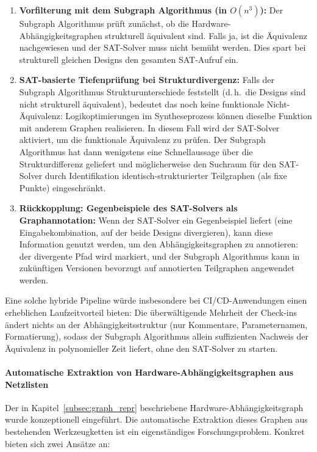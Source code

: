 ﻿\documentclass[12pt,a4paper]{report}
\begin{document}
\begin{enumerate}
    \item \textbf{Vorfilterung mit dem Subgraph Algorithmus (in $O(n^3)$):}
          Der Subgraph Algorithmus prüft zunächst, ob die Hardware-Abhängigkeitsgraphen
          strukturell äquivalent sind. Falls ja, ist die Äquivalenz nachgewiesen und der
          SAT-Solver muss nicht bemüht werden. Dies spart bei strukturell gleichen
          Designs den gesamten SAT-Aufruf ein.
    \item \textbf{SAT-basierte Tiefenprüfung bei Strukturdivergenz:}
          Falls der Subgraph Algorithmus Strukturunterschiede feststellt (d.\,h.\ die
          Designs sind nicht strukturell äquivalent), bedeutet das noch keine funktionale
          Nicht-Äquivalenz: Logikoptimierungen im Syntheseprozess können dieselbe Funktion
          mit anderem Graphen realisieren. In diesem Fall wird der SAT-Solver aktiviert,
          um die funktionale Äquivalenz zu prüfen. Der Subgraph Algorithmus hat dann
          wenigstens eine Schnellaussage über die Strukturdifferenz geliefert und
          möglicherweise den Suchraum für den SAT-Solver durch Identifikation
          identisch-strukturierter Teilgraphen (als fixe Punkte) eingeschränkt.
    \item \textbf{Rückkopplung: Gegenbeispiele des SAT-Solvers als Graphannotation:}
          Wenn der SAT-Solver ein Gegenbeispiel liefert (eine Eingabekombination, auf der
          beide Designs divergieren), kann diese Information genutzt werden, um den
          Abhängigkeitsgra\-phen zu annotieren: der divergente Pfad wird markiert,
          und der Subgraph Algorithmus kann in zukünftigen Versionen bevorzugt auf
          annotierten Teilgraphen angewendet werden.
\end{enumerate}

Eine solche hybride Pipeline würde insbesondere bei CI/CD-Anwendungen einen erheblichen
Laufzeitvorteil bieten: Die überwältigende Mehrheit der Check-ins ändert nichts an der
Abhängigkeitsstruktur (nur Kommentare, Parameternamen, Formatierung), sodass der
Subgraph Algorithmus allein suffizienten Nachweis der Äquivalenz in polynomieller Zeit
liefert, ohne den SAT-Solver zu starten.

\paragraph{Automatische Extraktion von Hardware-Abhängigkeitsgraphen aus Netzlisten}

Der in Kapitel~\ref{subsec:graph_repr} beschriebene Hardware-Abhängigkeitsgraph wurde
konzeptionell eingeführt. Die automatische Extraktion dieses Graphen aus bestehenden
Werkzeugketten ist ein eigenständiges Forschungsproblem. Konkret bieten sich zwei
Ansätze an:
\end{document}
